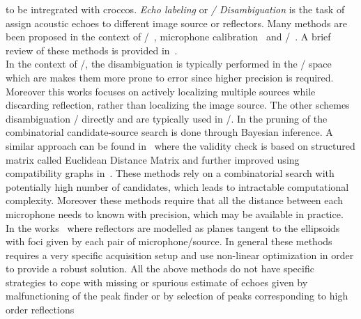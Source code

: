  to be intregrated with croccos.
\textit{Echo labeling} or \textit{\TOA/ Disambiguation} is the task of assign acoustic echoes to different image source or reflectors.
Many methods are been proposed in the context of \SSL/~, microphone calibration~\cite{parhizkar2014single,salvati2016sound}
and \RooGE/~.
A brief review of these methods is provided in~.
\\In the context of \SSL/, the disambiguation is typically performed in the \TDOAs/ space~ which are makes them more prone to error since higher precision is required.
Moreover this works focuses on actively localizing multiple sources while discarding reflection, rather than localizing the image source.
The other schemes disambiguation \TOAs/ directly and are typically used in \RooGE/.
In  the pruning of the combinatorial candidate-source search is done through Bayesian inference.
A similar approach can be found in~ where the validity check is based on structured matrix called Euclidean Distance Matrix and further improved using compatibility graphs in~.
These methods rely on a combinatorial search with potentially high number of candidates, which leads to intractable computational complexity.
Moreover these methods require that all the distance between each microphone needs to known with precision, which may be available in practice.
\\In the works~ where reflectors are modelled as planes tangent to the ellipsoids with foci given by each pair of microphone/source.
In general these methods requires a very specific acquisition setup and use non-linear optimization in order to provide a robust solution.
All the above methods do not have specific strategies to cope with missing or spurious estimate of echoes given by malfunctioning of the peak finder or by selection of peaks corresponding to high order reflections
